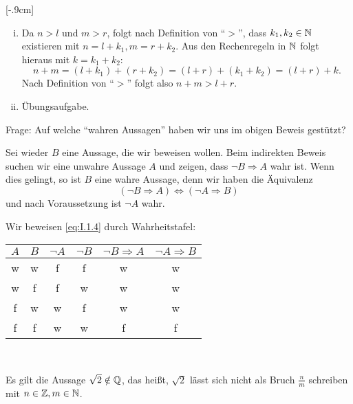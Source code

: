 \begin{beweis}
	\mbox{}[-.9cm]
	\begin{enumerate}[(i)]
		\item Da $n > l$ und $m > r$, folgt nach Definition von \enquote{$>$}, dass $k_1, k_2 \in \mathbb{N}$ existieren mit $n = l+k_1, m = r+k_2$.
		Aus den Rechenregeln in $\mathbb{N}$ folgt hieraus mit $k = k_1 + k_2$:
		\[
			n+m = (l+k_1) + (r+k_2) = (l+r)+(k_1+k_2) = (l+r) + k.
		\]
		Nach Definition von \enquote{$>$} folgt also $n+m > l+r$.
		\item Übungsaufgabe. \qedhere
	\end{enumerate}
\end{beweis}

Frage: Auf welche \enquote{wahren Aussagen} haben wir uns im obigen Beweis gestützt?

\begin{satz}
	\label{satz:I.1.4}
	Sei wieder $B$ eine Aussage, die wir beweisen wollen.
	Beim indirekten Beweis suchen wir eine unwahre Aussage $A$ und zeigen, dass $\neg B \Rightarrow A$ wahr ist.
	Wenn dies gelingt, so ist $B$ eine wahre Aussage, denn wir haben die Äquivalenz
	\begin{equation}
		(\neg B \Rightarrow A) \Leftrightarrow (\neg A \Rightarrow B) \label{eq:I.1.4}
	\end{equation}
	und nach Voraussetzung ist $\neg A$ wahr.
\end{satz}

\begin{beweis}
	Wir beweisen \eqref{eq:I.1.4} durch Wahrheitstafel:
	\begin{center}
		\begin{tabular}{cccccc}
			$A$ & $B$ & $\neg A$ & $\neg B$ & $\neg B \Rightarrow A$ & $\neg A \Rightarrow B$ \\ 
			\hline 
			w & w & f & f & w & w \\ 
			\hline 
			w & f & f & w & w & w \\ 
			\hline 
			f & w & w & f & w & w \\ 
			\hline 
			f & f & w & w & f & f \\ 
		\end{tabular} \\
		\qedhere
	\end{center}
\end{beweis}

\begin{beispiel}
	\label{bsp:I.1.5}
	Es gilt die Aussage $\sqrt{2} \notin \mathbb{Q}$, das heißt, $\sqrt{2}$ lässt sich nicht als Bruch $\frac{n}{m}$ schreiben mit $n \in \mathbb{Z}, m \in \mathbb{N}$.
\end{beispiel}

